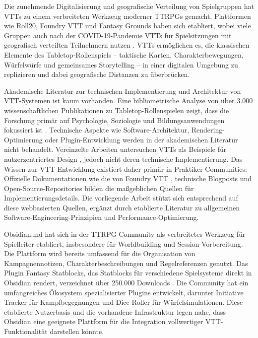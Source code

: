 Die zunehmende Digitalisierung und geografische Verteilung von Spielgruppen hat \ac{VTT}s zu einem verbreiteten Werkzeug moderner \ac{TTRPG}s gemacht. Plattformen wie Roll20, Foundry VTT und Fantasy Grounds haben sich etabliert, wobei viele Gruppen auch nach der COVID-19-Pandemie \ac{VTT}s für Spielsitzungen mit geografisch verteilten Teilnehmern nutzen \autocite{RPGDrop2024Market}. \ac{VTT}s ermöglichen es, die klassischen Elemente des Tabletop-Rollenspiels -- taktische Karten, Charakterbewegungen, Würfelwürfe und gemeinsames Storytelling -- in einer digitalen Umgebung zu replizieren und dabei geografische Distanzen zu überbrücken.

Akademische Literatur zur technischen Implementierung und Architektur von \ac{VTT}-Systemen ist kaum vorhanden. Eine bibliometrische Analyse von über 3.000 wissenschaftlichen Publikationen zu Tabletop-Rollenspielen zeigt, dass die Forschung primär auf Psychologie, Soziologie und Bildungsanwendungen fokussiert ist \autocite{Martinolli2025TTRPGBibliometrie}. Technische Aspekte wie Software-Architektur, Rendering-Optimierung oder Plugin-Entwicklung werden in der akademischen Literatur nicht behandelt. Vereinzelte Arbeiten untersuchen \ac{VTT}s als Beispiele für nutzerzentriertes Design \autocite{Szymczyk2022VTTVernacular}, jedoch nicht deren technische Implementierung. Das Wissen zur \ac{VTT}-Entwicklung existiert daher primär in Praktiker-Communities: Offizielle Dokumentationen wie die von Foundry VTT \autocite{FoundryVTT2024}, technische Blogposts und Open-Source-Repositories bilden die maßgeblichen Quellen für Implementierungsdetails. Die vorliegende Arbeit stützt sich entsprechend auf diese webbasierten Quellen, ergänzt durch etablierte Literatur zu allgemeinen Software-Engineering-Prinzipien und Performance-Optimierung.

Obsidian.md hat sich in der \ac{TTRPG}-Community als verbreitetes Werkzeug für Spielleiter etabliert, insbesondere für Worldbuilding und Session-Vorbereitung. Die Plattform wird bereits umfassend für die Organisation von Kampagnennotizen, Charakterbeschreibungen und Regelreferenzen genutzt. Das Plugin Fantasy Statblocks, das Statblocks für verschiedene Spielsysteme direkt in Obsidian rendert, verzeichnet über 250.000 Downloads \autocite{ValentineFantasyStatblocks2024}. Die Community hat ein umfangreiches Ökosystem spezialisierter Plugins entwickelt, darunter Initiative Tracker für Kampfbegegnungen \autocite{JavalentInitiativeTracker2024} und Dice Roller für Würfelsimulationen. Diese etablierte Nutzerbasis und die vorhandene Infrastruktur legen nahe, dass Obsidian eine geeignete Plattform für die Integration vollwertiger \ac{VTT}-Funktionalität darstellen könnte.

